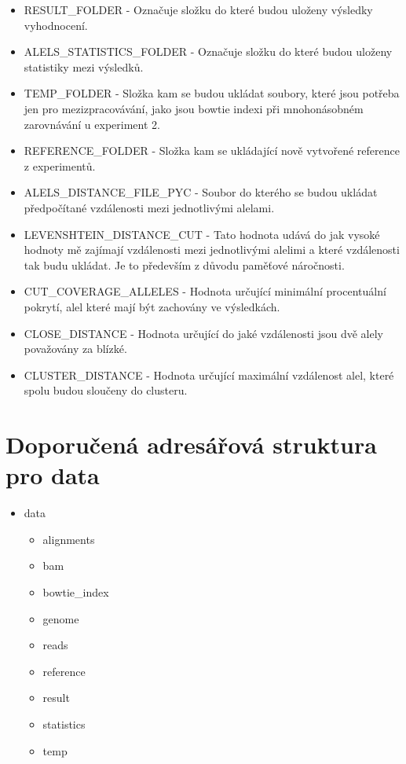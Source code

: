 \documentclass[czech,DP]{thesiskiv}
\numberwithin{equation}{section}
\begin{document}
\begin{itemize}
	\item RESULT\_FOLDER - Označuje složku do které budou uloženy výsledky vyhodnocení.
	\item ALELS\_STATISTICS\_FOLDER - Označuje složku do které budou uloženy statistiky mezi výsledků.
	\item TEMP\_FOLDER - Složka kam se budou ukládat soubory, které jsou potřeba jen pro mezizpracovávání, jako jsou bowtie indexi při mnohonásobném zarovnávání u experiment 2.
	\item REFERENCE\_FOLDER - Složka kam se ukládající nově vytvořené reference z experimentů.
	\item ALELS\_DISTANCE\_FILE\_PYC - Soubor do kterého se budou ukládat předpočítané vzdálenosti mezi jednotlivými alelami. 
	\item LEVENSHTEIN\_DISTANCE\_CUT - Tato hodnota udává do jak vysoké hodnoty mě zajímají vzdálenosti mezi jednotlivými alelimi a které vzdálenosti tak budu ukládat. Je to především z důvodu paměťové náročnosti.
	\item CUT\_COVERAGE\_ALLELES - Hodnota určující minimální procentuální pokrytí, alel které mají být zachovány ve výsledkách.
	 \item CLOSE\_DISTANCE - Hodnota určující do jaké vzdálenosti jsou dvě alely považovány za blízké.
	 \item CLUSTER\_DISTANCE - Hodnota určující maximální vzdálenost alel, které spolu budou sloučeny do clusteru.
\end{itemize}



\section{Doporučená adresářová struktura pro data}
\begin{itemize}
	\item data
		\begin{itemize}
			\item alignments
			\item bam
			\item bowtie\_index
			\item genome
			\item reads
			\item reference			
			\item result
			\item statistics 
			\item temp
		\end{itemize}
\end{itemize}
\end{document}

